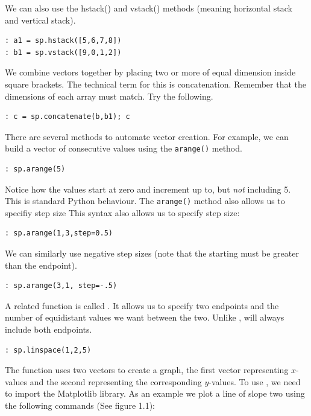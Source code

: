 We can also use the hstack() and vstack() methods (meaning horizontal stack and
vertical stack).
\begin{lstlisting}
: a1 = sp.hstack([5,6,7,8])
: b1 = sp.vstack([9,0,1,2])
\end{lstlisting}

We combine vectors together by placing two or more of equal dimension inside
square brackets. The technical term for this is concatenation.  Remember that
the dimensions of each array must match.  Try the following.
\begin{lstlisting}
: c = sp.concatenate(b,b1); c
\end{lstlisting}

There are several methods to automate vector creation. For example, we can build
a vector of consecutive values using the \texttt{arange()} method.

\begin{lstlisting}
: sp.arange(5)
\end{lstlisting}

Notice how the values start at zero and increment up to, but \emph{not}
including 5.  This is standard Python behaviour.  The \texttt{arange()} method
also allows us to specifiy step size
This syntax also allows us to specify step size:

\begin{lstlisting}
: sp.arange(1,3,step=0.5)
\end{lstlisting}

We can similarly use negative step sizes (note that the starting must be greater
than the endpoint).

\begin{lstlisting}
: sp.arange(3,1, step=-.5)
\end{lstlisting}

A related function is called . It allows us to specify two
endpoints and the number of equidistant values we want between the two.  Unlike
,  will always include both endpoints.

\begin{lstlisting}
: sp.linspace(1,2,5)
\end{lstlisting}

The  function uses two vectors to create a graph, the first vector
representing $x$-values and the second representing the corresponding
$y$-values.  To use , we need to import the Matplotlib library.  As
an example we plot a line of slope two using the following commands (See figure
1.1):

